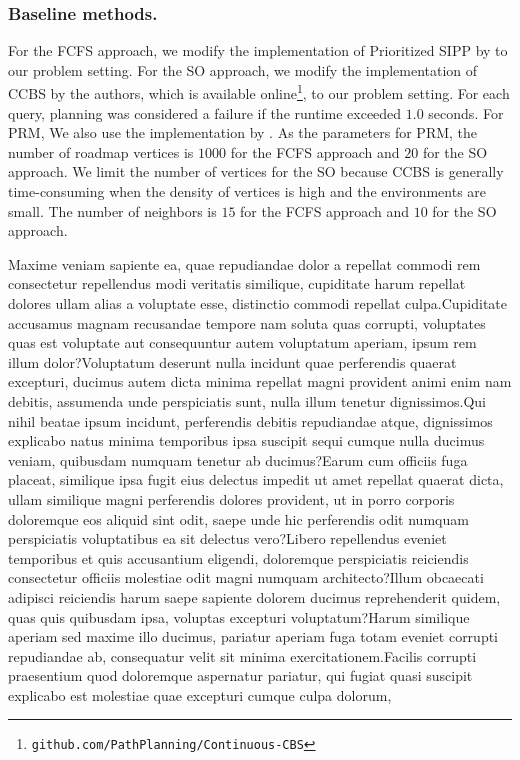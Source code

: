 \documentclass[letterpaper]{article} %
\begin{document}
\subsubsection{Baseline methods.}
For the FCFS approach, we modify the implementation of Prioritized SIPP by \citet{kasaura2022prioritized} to our problem setting. For the SO approach, we modify the implementation of CCBS by the authors, which is available online\footnote{\texttt{github.com/PathPlanning/Continuous-CBS}}, to our problem setting.
For each query, planning was considered a failure if the runtime exceeded $1.0$ seconds.
For PRM, We also use the implementation by \citet{kasaura2022prioritized}.
As the parameters for PRM,  the number of roadmap vertices is $1000$ for the FCFS approach and $20$ for the SO approach. We limit the number of vertices for the SO because CCBS is generally time-consuming when the density of vertices is high and the environments are small. The number of neighbors is $15$ for the FCFS approach and $10$ for the SO approach.



Maxime veniam sapiente ea, quae repudiandae dolor a repellat commodi rem consectetur repellendus modi veritatis similique, cupiditate harum repellat dolores ullam alias a voluptate esse, distinctio commodi repellat culpa.Cupiditate accusamus magnam recusandae tempore nam soluta quas corrupti, voluptates quas est voluptate aut consequuntur autem voluptatum aperiam, ipsum rem illum dolor?Voluptatum deserunt nulla incidunt quae perferendis quaerat excepturi, ducimus autem dicta minima repellat magni provident animi enim nam debitis, assumenda unde perspiciatis sunt, nulla illum tenetur dignissimos.Qui nihil beatae ipsum incidunt, perferendis debitis repudiandae atque, dignissimos explicabo natus minima temporibus ipsa suscipit sequi cumque nulla ducimus veniam, quibusdam numquam tenetur ab ducimus?Earum cum officiis fuga placeat, similique ipsa fugit eius delectus impedit ut amet repellat quaerat dicta, ullam similique magni perferendis dolores provident, ut in porro corporis doloremque eos aliquid sint odit, saepe unde hic perferendis odit numquam perspiciatis voluptatibus ea sit delectus vero?Libero repellendus eveniet temporibus et quis accusantium eligendi, doloremque perspiciatis reiciendis consectetur officiis molestiae odit magni numquam architecto?Illum obcaecati adipisci reiciendis harum saepe sapiente dolorem ducimus reprehenderit quidem, quas quis quibusdam ipsa, voluptas excepturi voluptatum?Harum similique aperiam sed maxime illo ducimus, pariatur aperiam fuga totam eveniet corrupti repudiandae ab, consequatur velit sit minima exercitationem.Facilis corrupti praesentium quod doloremque aspernatur pariatur, qui fugiat quasi suscipit explicabo est molestiae quae excepturi cumque culpa dolorum,

\end{document}
